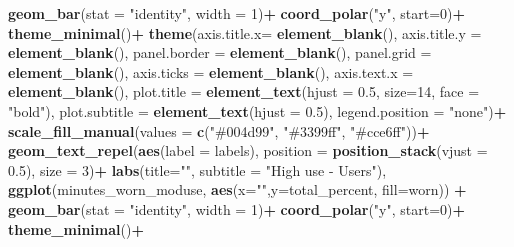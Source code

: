 \documentclass[
]{article}
\newenvironment{Shaded}{\begin{snugshade}}{\end{snugshade}}
\newcommand{\AttributeTok}[1]{\textcolor[rgb]{0.13,0.29,0.53}{#1}}
\newcommand{\DecValTok}[1]{\textcolor[rgb]{0.00,0.00,0.81}{#1}}
\newcommand{\FloatTok}[1]{\textcolor[rgb]{0.00,0.00,0.81}{#1}}
\newcommand{\FunctionTok}[1]{\textcolor[rgb]{0.13,0.29,0.53}{\textbf{#1}}}
\newcommand{\NormalTok}[1]{#1}
\newcommand{\SpecialCharTok}[1]{\textcolor[rgb]{0.81,0.36,0.00}{\textbf{#1}}}
\newcommand{\StringTok}[1]{\textcolor[rgb]{0.31,0.60,0.02}{#1}}
\begin{document}
\begin{Shaded}
\begin{Highlighting}[]
  \FunctionTok{geom\_bar}\NormalTok{(}\AttributeTok{stat =} \StringTok{"identity"}\NormalTok{, }\AttributeTok{width =} \DecValTok{1}\NormalTok{)}\SpecialCharTok{+}
  \FunctionTok{coord\_polar}\NormalTok{(}\StringTok{"y"}\NormalTok{, }\AttributeTok{start=}\DecValTok{0}\NormalTok{)}\SpecialCharTok{+}
  \FunctionTok{theme\_minimal}\NormalTok{()}\SpecialCharTok{+}
  \FunctionTok{theme}\NormalTok{(}\AttributeTok{axis.title.x=} \FunctionTok{element\_blank}\NormalTok{(),}
        \AttributeTok{axis.title.y =} \FunctionTok{element\_blank}\NormalTok{(),}
        \AttributeTok{panel.border =} \FunctionTok{element\_blank}\NormalTok{(), }
        \AttributeTok{panel.grid =} \FunctionTok{element\_blank}\NormalTok{(), }
        \AttributeTok{axis.ticks =} \FunctionTok{element\_blank}\NormalTok{(),}
        \AttributeTok{axis.text.x =} \FunctionTok{element\_blank}\NormalTok{(),}
        \AttributeTok{plot.title =} \FunctionTok{element\_text}\NormalTok{(}\AttributeTok{hjust =} \FloatTok{0.5}\NormalTok{, }\AttributeTok{size=}\DecValTok{14}\NormalTok{, }\AttributeTok{face =} \StringTok{"bold"}\NormalTok{),}
        \AttributeTok{plot.subtitle =} \FunctionTok{element\_text}\NormalTok{(}\AttributeTok{hjust =} \FloatTok{0.5}\NormalTok{), }
        \AttributeTok{legend.position =} \StringTok{"none"}\NormalTok{)}\SpecialCharTok{+}
    \FunctionTok{scale\_fill\_manual}\NormalTok{(}\AttributeTok{values =} \FunctionTok{c}\NormalTok{(}\StringTok{"\#004d99"}\NormalTok{, }\StringTok{"\#3399ff"}\NormalTok{, }\StringTok{"\#cce6ff"}\NormalTok{))}\SpecialCharTok{+}
  \FunctionTok{geom\_text\_repel}\NormalTok{(}\FunctionTok{aes}\NormalTok{(}\AttributeTok{label =}\NormalTok{ labels),}
            \AttributeTok{position =} \FunctionTok{position\_stack}\NormalTok{(}\AttributeTok{vjust =} \FloatTok{0.5}\NormalTok{), }\AttributeTok{size =} \DecValTok{3}\NormalTok{)}\SpecialCharTok{+}
  \FunctionTok{labs}\NormalTok{(}\AttributeTok{title=}\StringTok{""}\NormalTok{, }\AttributeTok{subtitle =} \StringTok{"High use {-} Users"}\NormalTok{), }
  \FunctionTok{ggplot}\NormalTok{(minutes\_worn\_moduse, }\FunctionTok{aes}\NormalTok{(}\AttributeTok{x=}\StringTok{""}\NormalTok{,}\AttributeTok{y=}\NormalTok{total\_percent, }\AttributeTok{fill=}\NormalTok{worn)) }\SpecialCharTok{+}
  \FunctionTok{geom\_bar}\NormalTok{(}\AttributeTok{stat =} \StringTok{"identity"}\NormalTok{, }\AttributeTok{width =} \DecValTok{1}\NormalTok{)}\SpecialCharTok{+}
  \FunctionTok{coord\_polar}\NormalTok{(}\StringTok{"y"}\NormalTok{, }\AttributeTok{start=}\DecValTok{0}\NormalTok{)}\SpecialCharTok{+}
  \FunctionTok{theme\_minimal}\NormalTok{()}\SpecialCharTok{+}

\end{Highlighting}
\end{Shaded}
\end{document}
